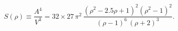\begin{equation}
S(\rho)\equiv \frac{A^4}{V^3}=32 \times
27\,\pi^2\,\frac{\left(\rho^{2}-2.5\rho +
1\right)^2(\rho^2-1)^2}{(\rho-1)^6\,(\rho+2)^3}.
\end{equation}

